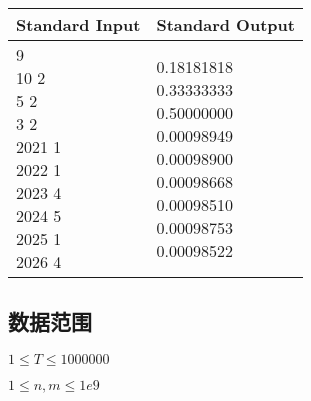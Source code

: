 \begin{table}[H]
\begin{tabularx}{\textwidth}{|X|X|}
    \hline
    \textbf{Standard Input} & \textbf{Standard Output} \\ 
    \hline 
    \tablecell{
        9 \\
    10 2 \\
    5 2 \\
    3 2 \\
    2021 1 \\
    2022 1 \\
    2023 4 \\
    2024 5 \\
    2025 1 \\
    2026 4 \\
    } & 
    \tablecell{0.18181818  \\
    0.33333333 \\
    0.50000000 \\
    0.00098949 \\
    0.00098900 \\
    0.00098668 \\
    0.00098510 \\
    0.00098753 \\
    0.00098522 \\} \\
    \hline
\end{tabularx}
\end{table}
\subsection*{数据范围}
$1 \leq T \leq 1000000$

$1 \leq n,m \leq 1e9$
